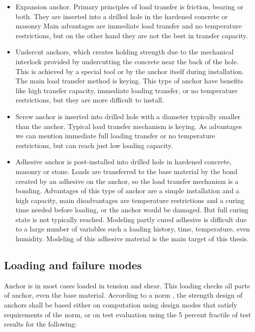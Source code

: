 	\begin{itemize}

	\item Expansion anchor. Primary principles of load transfer is friction, bearing or both. They are inserted into a drilled hole in the hardened concrete or masonry Main advantages are immediate load transfer and no temperature restrictions, but on the other hand they are not the best in transfer capacity. 

	\item Undercut anchors, which creates holding strength due to the mechanical interlock provided by undercutting the concrete near the back of the hole. This is achieved by a special tool or by the anchor itself during installation. The main load transfer method is keying. This type of anchor have benefits like high transfer capacity, immediate loading transfer, or no temperature restrictions, but they are more difficult to install. 

	\item Screw anchor is inserted into drilled hole with a diameter typically smaller than the anchor. Typical load transfer mechanism is keying. As advantages we can mention immediate full loading transfer or no temperature restrictions, but can reach just low loading capacity.

	\item Adhesive anchor is post-installed into drilled hole in hardened concrete, masonry or stone. Loads are transferred to the base material by the bond created by an adhesive on the anchor, so the load transfer mechanism is a bonding. Advantages of this type of anchor are a simple installation and a high capacity, main disadvantages are temperature restrictions and a curing time needed before loading, or the anchor would be damaged. But full curing state is not typically reached. Modeling partly cured adhesive is difficult due to a large number of variables such a loading history, time, temperature, even humidity. Modeling of this adhesive material is the main target of this thesis.
\end{itemize} 

\subsection{Loading and failure modes}
Anchor is in most cases loaded in tension and shear. This loading checks all parts of anchor, even the base material. According to a norm \cite{anchors-ACI-318M}, the strength design of anchors shall be based either on computation using design modes that satisfy requirements of the norm, or on test evaluation using the 5 percent fractile of test results for the following:

